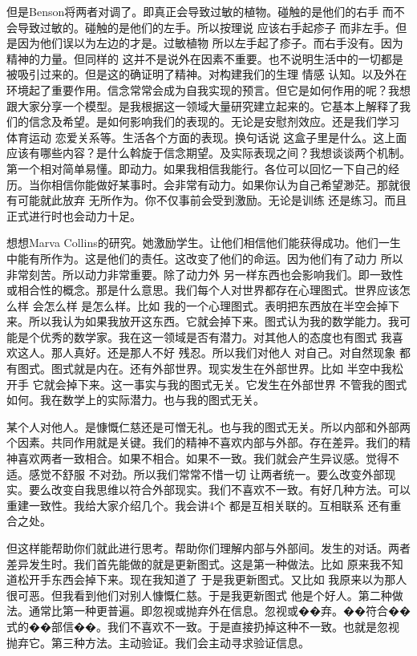 但是Benson将两者对调了。即真正会导致过敏的植物。碰触的是他们的右手 而不会导致过敏的。碰触的是他们的左手。所以按理说 应该右手起疹子 而非左手。但是因为他们误以为左边的才是。过敏植物 所以左手起了疹子。而右手没有。因为精神的力量。但同样的 这并不是说外在因素不重要。也不说明生活中的一切都是被吸引过来的。但是这的确证明了精神。对构建我们的生理 情感 认知。以及外在环境起了重要作用。信念常常会成为自我实现的预言。但它是如何作用的呢？我想跟大家分享一个模型。是我根据这一领域大量研究建立起来的。它基本上解释了我们的信念及希望。是如何影响我们的表现的。无论是安慰剂效应。还是我们学习 体育运动 恋爱关系等。生活各个方面的表现。换句话说 这盒子里是什么。这上面应该有哪些内容？是什么斡旋于信念期望。及实际表现之间？我想谈谈两个机制。第一个相对简单易懂。即动力。如果我相信我能行。各位可以回忆一下自己的经历。当你相信你能做好某事时。会非常有动力。如果你认为自己希望渺茫。那就很有可能就此放弃 无所作为。你不仅事前会受到激励。无论是训练 还是练习。而且正式进行时也会动力十足。 

想想Marva Collins的研究。她激励学生。让他们相信他们能获得成功。他们一生中能有所作为。这是他们的责任。这改变了他们的命运。因为他们有了动力 所以非常刻苦。所以动力非常重要。除了动力外 另一样东西也会影响我们。即一致性或相合性的概念。那是什么意思。我们每个人对世界都存在心理图式。世界应该怎么样 会怎么样 是怎么样。比如 我的一个心理图式。表明把东西放在半空会掉下来。所以我认为如果我放开这东西。它就会掉下来。图式认为我的数学能力。我可能是个优秀的数学家。我在这一领域是否有潜力。对其他人的态度也有图式 我喜欢这人。那人真好。还是那人不好 残忍。所以我们对他人 对自己。对自然现象 都有图式。图式就是内在。还有外部世界。现实发生在外部世界。比如 半空中我松开手 它就会掉下来。这一事实与我的图式无关。它发生在外部世界 不管我的图式如何。我在数学上的实际潜力。也与我的图式无关。 

某个人对他人。是慷慨仁慈还是可憎无礼。也与我的图式无关。所以内部和外部两个因素。共同作用就是关键。我们的精神不喜欢内部与外部。存在差异。我们的精神喜欢两者一致相合。如果不相合。如果不一致。我们就会产生异议感。觉得不适。感觉不舒服 不对劲。所以我们常常不惜一切 让两者统一。要么改变外部现实。要么改变自我思维以符合外部现实。我们不喜欢不一致。有好几种方法。可以重建一致性。我给大家介绍几个。我会讲4个 都是互相关联的。互相联系 还有重合之处。 

但这样能帮助你们就此进行思考。帮助你们理解内部与外部间。发生的对话。两者差异发生时。我们首先能做的就是更新图式。这是第一种做法。比如 原来我不知道松开手东西会掉下来。现在我知道了 于是我更新图式。又比如 我原来以为那人很可恶。但我看到他们对别人慷慨仁慈。于是我更新图式 他是个好人。第二种做法。通常比第一种更普遍。即忽视或抛弃外在信息。忽视或��弃。��符合��式的��部信��。我们不喜欢不一致。于是直接扔掉这种不一致。也就是忽视 抛弃它。第三种方法。主动验证。我们会主动寻求验证信息。 

